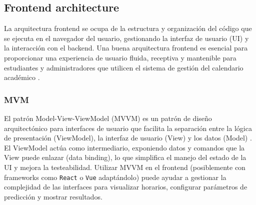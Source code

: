 \subsection{Frontend architecture}
La arquitectura frontend se ocupa de la estructura y organización del código que se ejecuta en el navegador del usuario, gestionando la interfaz de usuario (UI) y la interacción con el backend.
Una buena arquitectura frontend es esencial para proporcionar una experiencia de usuario fluida, receptiva y mantenible para estudiantes y administradores que utilicen el sistema de gestión del calendario académico \parencite{Osmani2017}.

\subsubsection{MVM}
El patrón Model-View-ViewModel (MVVM) es un patrón de diseño arquitectónico para interfaces de usuario que facilita la separación entre la lógica de presentación (ViewModel), la interfaz de usuario (View) y los datos (Model) \parencite{Smith2005}.
El ViewModel actúa como intermediario, exponiendo datos y comandos que la View puede enlazar (data binding), lo que simplifica el manejo del estado de la UI y mejora la testeabilidad.
Utilizar MVVM en el frontend (posiblemente con frameworks como \texttt{React} o \texttt{Vue} adaptándolo) puede ayudar a gestionar la complejidad de las interfaces para visualizar horarios, configurar parámetros de predicción y mostrar resultados.
